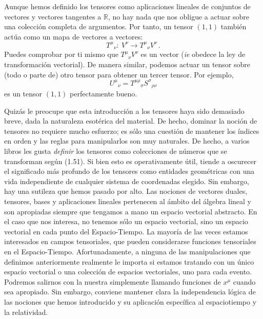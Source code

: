 \documentclass[11pt,b5paper,openany,twoside]{book}
\begin{document}
Aunque hemos definido los tensores como aplicaciones lineales de conjuntos de vectores y vectores tangentes a $\mathbb{R}$, no hay nada que nos obligue a actuar sobre una colección completa de argumentos.
Por tanto, un tensor $(1,1)$ también actúa como un mapa de vectores a vectores:
\begin{equation}
T^\mu{}_\nu :~ V^\nu\rightarrow T^\mu{}_\nu V^\nu\,.\label{1.52}
\end{equation}
Puedes comprobar por ti mismo que $T^\mu{}_\nu V^\nu$ es un vector ({\it ie} obedece la ley de transformación vectorial).
De manera similar, podemos actuar un tensor sobre (todo o parte de) otro tensor para obtener un tercer tensor.
Por ejemplo,
\begin{equation}
U^\mu{}_\nu = T^{\mu\rho}{}_\sigma S^{\sigma}{}_{\rho\nu}\label{1.53}
\end{equation}
es un tensor $(1,1)$ perfectamente bueno.

Quizás le preocupe que esta introducción a los tensores haya sido demasiado breve, dada la naturaleza esotérica del material.
De hecho, dominar la noción de tensores no requiere mucho esfuerzo; es sólo una cuestión de mantener los índices en orden y las reglas para manipularlos son muy naturales.
De hecho, a varios libros les gusta \textit{definir} los tensores como colecciones de números que se transforman según (1.51).
Si bien esto es operativamente útil, tiende a oscurecer el significado más profundo de los tensores como entidades geométricas con una vida independiente de cualquier sistema de coordenadas elegido.
Sin embargo, hay una sutileza que hemos pasado por alto.
Las nociones de vectores duales, tensores, bases y aplicaciones lineales pertenecen al ámbito del álgebra lineal y son apropiadas siempre que tengamos a mano un espacio vectorial abstracto.
En el caso que nos interesa, no tenemos sólo un espacio vectorial, sino un espacio vectorial en cada punto del Espacio-Tiempo.
La mayoría de las veces estamos interesados en campos tensoriales, que pueden considerarse funciones tensoriales en el Espacio-Tiempo.
Afortunadamente, a ninguna de las manipulaciones que definimos anteriormente realmente le importa si estamos tratando con un único espacio vectorial o una colección de espacios vectoriales, uno para cada evento.
Podremos salirnos con la nuestra simplemente llamando funciones de $x^\mu$ cuando sea apropiado.
Sin embargo, conviene mantener clara la independencia lógica de las nociones que hemos introducido y su aplicación específica al espaciotiempo y la relatividad.
\end{document}
